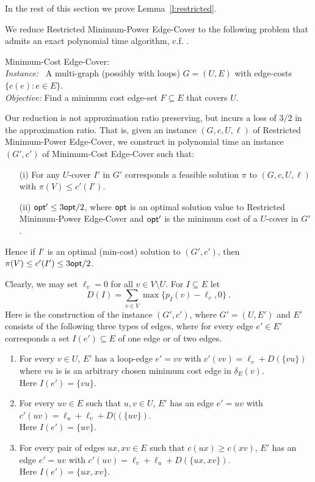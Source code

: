 \documentclass{llncs}
\begin{document}
In the rest of this section we prove Lemma~\ref{l:restricted}.

We reduce {\sf Restricted Minimum-Power Edge-Cover} to the following problem that admits an exact polynomial time algorithm, c.f. \cite{Sch}.

\vspace{0.2cm}

\noindent
{\sf Minimum-Cost Edge-Cover}: \\
{\em Instance:} \ A multi-graph (possibly with loops) $G=(U,E)$ with edge-costs 
\hphantom{\em Instance: }~$\{c(e):e \in E\}$. \\
{\em Objective:} Find a minimum cost edge-set $F \subseteq E$ that covers $U$. 

\vspace{0.2cm}

Our reduction is not approximation ratio preserving, but incurs a loss of $3/2$ in the appro\-xi\-mation ratio.
That is, given an instance $(G,c,U,\ell)$ of {\sf Restricted Minimum-Power Edge-Cover}, 
we construct in polynomial time an instance $(G',c')$ of {\sf Minimum-Cost Edge-Cover} such that:
\begin{itemize}
\item[(i)] 
For any $U$-cover $I'$ in $G'$ corresponds a feasible 
solution $\pi$ to $(G,c,U,\ell)$ with $\pi(V) \leq c'(I')$.
\item[(ii)] 
${\sf opt}' \leq  3{\sf opt}/2$, where ${\sf opt}$ is an optimal solution value 
to {\sf Restricted Minimum-Power Edge-Cover} and
${\sf opt}'$ is the minimum cost of a $U$-cover in $G'$.
\end{itemize}
Hence if $I'$ is an optimal (min-cost) solution to $(G',c')$, then 
$\pi(V) \leq c'(I') \leq 3{\sf opt}/2$.

Clearly, we may 
set $\ell_v=0$ for all $v \in V \setminus U$.
For $I \subseteq E$ let 
$$D(I)=\sum_{v \in V} \max\{p_I(v)-\ell_v,0\} \ .$$
Here is the construction of the instance $(G',c')$, where $G'=(U,E')$ and $E'$ 
consists of the following three types of edges, where for every edge $e' \in E'$
corresponds a set $I(e') \subseteq E$ of one edge or of two edges.  

\begin{enumerate}
\item 
For every $v \in U$, $E'$ has a loop-edge $e'=vv$ with 
$c'(vv)=\ell_v+D(\{vu\})$ where $vu$ is is an arbitrary chosen minimum cost edge 
in $\delta_E(v)$. \\
Here $I(e')=\{vu\}$.
\item 
For every $uv \in E$ such that $u,v \in U$, $E'$ has an edge $e'=uv$ with 
$c'(uv)=\ell_u + \ell_v +D((\{uv\})$. \\
Here $I(e')=\{uv\}$.
\item 
For every pair of edges $ux,xv \in E$ such that $c(ux) \geq c(xv)$, $E'$ has an edge $e'=uv$ 
with $c'(uv)=\ell_v+\ell_u+D(\{ux,xv\})$. \\
Here $I(e')=\{ux,xv\}$.
\end{enumerate}
\end{document}

